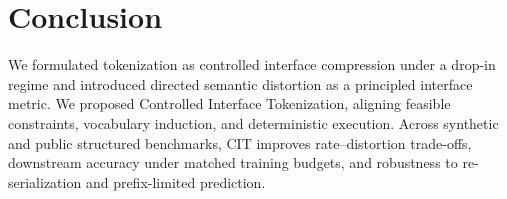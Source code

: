 \section{Conclusion}
\label{sec:conclusion}

We formulated tokenization as controlled interface compression under a drop-in regime and introduced directed semantic distortion as a principled interface metric.
We proposed Controlled Interface Tokenization, aligning feasible constraints, vocabulary induction, and deterministic execution.
Across synthetic and public structured benchmarks, CIT improves rate--distortion trade-offs, downstream accuracy under matched training budgets, and robustness to re-serialization and prefix-limited prediction.
